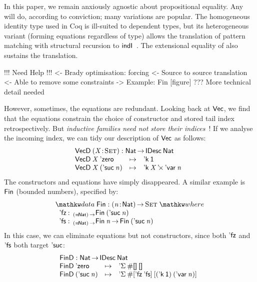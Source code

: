 In this paper, we remain anxiously agnostic about
propositional equality. Any will do, according to
conviction; many variations are popular. The
homogeneous identity type used in Coq is ill-suited to
dependent types, but its heterogeneous variant (forming equations
regardless of type) allows the translation of pattern
matching with structural recursion to
\(\F{indI}\)~\cite{goguen:pattern-matching}. The
extensional equality of \citet{altenkirch:ott} also sustains the translation.

\begin{wstructure}
!!! Need Help !!!
<- Brady optimisation: forcing
    <- Source to source translation
    <- Able to remove some constraints
    -> Example: Fin [figure]
    ??? More technical detail needed
\end{wstructure}

However, sometimes, the equations are redundant. 
Looking back at $\D{Vec}$, we find that the equations constrain
the choice of constructor and stored tail index retrospectively.
But \emph{inductive families need not store their
  indices}~\cite{brady:index-inductive-families}!  If we
analyse the incoming index, we can tidy our description of $\D{Vec}$
as follows:
%
\[\stk{
\VecD \:\PITEL{\V{X}}{\Set} : \Nat \To \IDesc{\Nat} \\
\begin{array}{@{}lll}
\VecD\:\V{X}\: \NatZero     & \mapsto & \DConst{\Unit} \\
\VecD\:\V{X}\: (\NatSuc{\V{n}}) & \mapsto &
 \DProd{\DConst{\V{X}}}{\DVar{\V{n}}}
\end{array}
                                       
}\]
%
The constructors and equations have simply disappeared. A similar
example is $\SYMBFin$ (bounded numbers), specified by:
%
\[
\stk{
\data \SYMBFin : \PI{\V{n}}{\Nat} \Set \where \\
\;\;\begin{array}{@{}l@{\::\:\:}l@{\quad}l}
    \FinZero      & _{\PI{\V{n}}{\Nat}}\Fin{(\NatSuc{\V{n}})}   \\
    \SYMBFinSuc   & _{\PI{\V{n}}{\Nat}}\Fin{\V{n}} \To \Fin{(\NatSuc{\V{n}})}
\end{array}
}\]
%
In this case, we can eliminate equations but not constructors, since both
$\FinZero$ and $\SYMBFinSuc$ both target $\SYMBNatSuc$:
%
\[\stk{
\FinD : \Nat \To \IDesc{\Nat} \\
\begin{array}{@{}lll}
\FinD\: \NatZero         & \mapsto & \DSigma{\EnumT{\Void}}{\Void} \\
\FinD\: (\NatSuc{\V{n}}) & \mapsto & \DSigma{\EnumT{\sqr{\FinZero\: \SYMBFinSuc}}}
                                            {\sqr{(\DConst{\Unit})\: (\DVar{\V{n}})}}
\end{array}
}\]

